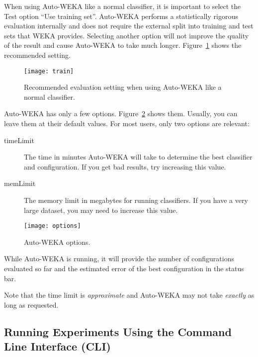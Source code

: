 \documentclass{article}
\begin{document}
When using Auto-WEKA like a normal classifier, it is important to select the
Test option ``Use training set''. Auto-WEKA performs a statistically rigorous
evaluation internally and does not require the external split into training and
test sets that WEKA provides. Selecting another option will not improve the
quality of the result and cause Auto-WEKA to take much longer.
Figure~\ref{fig:train} shows the recommended setting.

\begin{figure}[!ht]
\begin{center}
\texttt{[image: train]}
\caption{Recommended evaluation setting when using Auto-WEKA like a normal
classifier.}
\label{fig:train}
\end{center}
\end{figure}

Auto-WEKA has only a few options. Figure~\ref{fig:options} shows them. Usually,
you can leave them at their default values. For most users, only two options are
relevant:
\begin{description}
\item[timeLimit] The time in minutes Auto-WEKA will take to determine the best
classifier and configuration. If you get bad results, try increasing this value.
\item[memLimit] The memory limit in megabytes for running classifiers. If you
have a very large dataset, you may need to increase this value.
\end{description}

\begin{figure}[!ht]
\begin{center}
\texttt{[image: options]}
\caption{Auto-WEKA options.}
\label{fig:options}
\end{center}
\end{figure}

While Auto-WEKA is running, it will provide the number of configurations
evaluated so far and the estimated error of the best configuration in the status
bar.

\medskip

Note that the time limit is \emph{approximate} and Auto-WEKA may not take
\emph{exactly} as long as requested.

\subsection{Running Experiments Using the Command Line Interface (CLI)}\label{sec:running}
\end{document}
